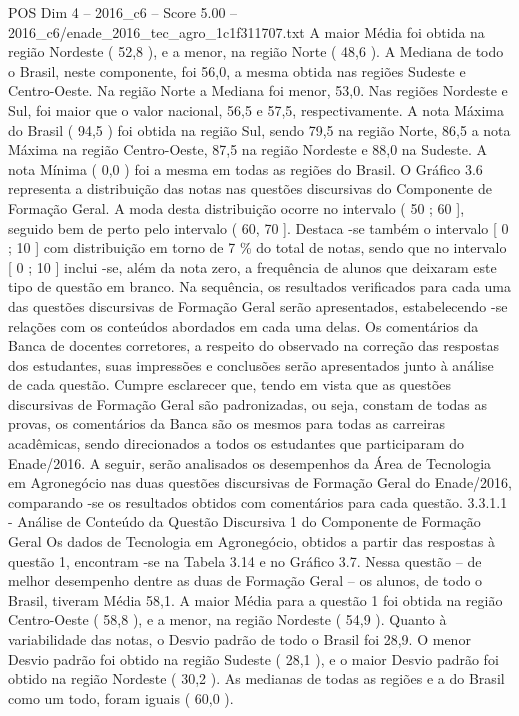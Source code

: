 \begin{textsample}{POS Dim 4 – 2016\_c6 – Score 5.00 – 2016\_c6/enade\_2016\_tec\_agro\_1c1f311707.txt}
A maior Média foi obtida na região Nordeste ( 52,8 ), e a menor, na região Norte ( 48,6 ).
A Mediana de todo o Brasil, neste componente, foi 56,0, a mesma obtida nas regiões Sudeste e Centro-Oeste.
Na região Norte a Mediana foi menor, 53,0.
Nas regiões Nordeste e Sul, foi maior que o valor nacional, 56,5 e 57,5, respectivamente.
A nota Máxima do Brasil ( 94,5 ) foi obtida na região Sul, sendo 79,5 na região Norte, 86,5 a nota Máxima na região Centro-Oeste, 87,5 na região Nordeste e 88,0 na Sudeste.
A nota Mínima ( 0,0 ) foi a mesma em todas as regiões do Brasil.
O Gráfico 3.6 representa a distribuição das notas nas questões discursivas do Componente de Formação Geral.
A moda desta distribuição ocorre no intervalo ( 50 ; 60 ], seguido bem de perto pelo intervalo ( 60, 70 ].
Destaca -se também o intervalo [ 0 ; 10 ] com distribuição em torno de 7 \% do total de notas, sendo que no intervalo [ 0 ; 10 ] inclui -se, além da nota zero, a frequência de alunos que deixaram este tipo de questão em branco.
Na sequência, os resultados verificados para cada uma das questões discursivas de Formação Geral serão apresentados, estabelecendo -se relações com os conteúdos abordados em cada uma delas.
Os comentários da Banca de docentes corretores, a respeito do observado na correção das respostas dos estudantes, suas impressões e conclusões serão apresentados junto à análise de cada questão.
Cumpre esclarecer que, tendo em vista que as questões discursivas de Formação Geral são padronizadas, ou seja, constam de todas as provas, os comentários da Banca são os mesmos para todas as carreiras acadêmicas, sendo direcionados a todos os estudantes que participaram do Enade/2016.
A seguir, serão analisados os desempenhos da Área de Tecnologia em Agronegócio nas duas questões discursivas de Formação Geral do Enade/2016, comparando -se os resultados obtidos com comentários para cada questão. 3.3.1.1 - Análise de Conteúdo da Questão Discursiva 1 do Componente de Formação Geral Os dados de Tecnologia em Agronegócio, obtidos a partir das respostas à questão 1, encontram -se na Tabela 3.14 e no Gráfico 3.7.
Nessa questão – de melhor desempenho dentre as duas de Formação Geral – os alunos, de todo o Brasil, tiveram Média 58,1.
A maior Média para a questão 1 foi obtida na região Centro-Oeste ( 58,8 ), e a menor, na região Nordeste ( 54,9 ).
Quanto à variabilidade das notas, o Desvio padrão de todo o Brasil foi 28,9.
O menor Desvio padrão foi obtido na região Sudeste ( 28,1 ), e o maior Desvio padrão foi obtido na região Nordeste ( 30,2 ).
As medianas de todas as regiões e a do Brasil como um todo, foram iguais ( 60,0 ).

\end{textsample}
